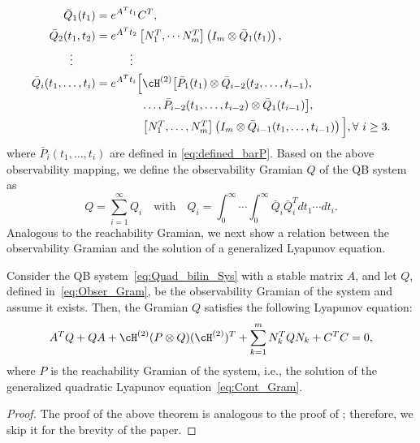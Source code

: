 \begin{align*}
 \bar Q_1(t_1) &=  e^{A^Tt_1}C^T, \\
 \bar Q_2(t_1,t_2) &=  e^{A^Tt_2}\bbm N^T_1,\cdots N_m^T\ebm \left(I_m\otimes \bar Q_1(t_1)\right),\\
 \vdots\qquad&\qquad\quad\vdots\nonumber\\
  \bar Q_i (t_1,\ldots, t_i)&= e^{A^Tt_i}\Big[\cH^{(2)} \big[\bar P_1(t_1)\otimes \bar Q_{i-2}(t_{2},\ldots,t_{i-1}), \nonumber \\ %
     &\qquad \qquad \ldots, \bar P_{i-2}(t_{1},\ldots,t_{i-2})\otimes \bar Q_1(t_{i-1})\big], \\%
  &\qquad \qquad\bbm N^T_1,\ldots,N^T_m\ebm\left(I_m\otimes \bar Q_{i-1}(t_1,\ldots,t_{i-1})\right)\Big],\forall~i\geq 3.
\end{align*}
where $\bar P_i(t_1,\ldots,t_i)$ are defined in \eqref{eq:defined_barP}. Based on the above observability mapping, we define the observability Gramian $Q$ of the QB system as
\begin{equation}\label{eq:Obser_Gram}
 Q = \sum_{i=1}^{\infty}Q_i\quad \mbox{with}\quad Q_i = \int_0^\infty\cdots \int_0^\infty \bar Q_i\bar Q_i^Tdt_1\cdots dt_i.
\end{equation}
Analogous to the reachability Gramian, we next show a relation between the observability Gramian and the solution of  a generalized  Lyapunov equation.
\begin{theorem}\label{thm:obser_gram}
 Consider the QB system~\eqref{eq:Quad_bilin_Sys}  with a stable matrix $A$, and let $Q$, defined in~\eqref{eq:Obser_Gram},  be the observability Gramian of the system and assume it exists.  Then, the Gramian $Q$ satisfies the following  Lyapunov equation:
 \begin{equation}\label{eq:obser_lyap}
 A^TQ + QA  +   \cH^{(2)}(P\otimes Q) (\cH^{(2)})^T + \sum_{k=1}^m N_k^TQN_k +C^TC = 0,
 \end{equation}
 where $P$ is the reachability Gramian of the system, i.e., the solution of the generalized quadratic Lyapunov equation~\eqref{eq:Cont_Gram}.
\end{theorem}
\begin{proof}
The proof of the above theorem is analogous to the proof of ; therefore, we skip it for the brevity of the paper.
\end{proof}

